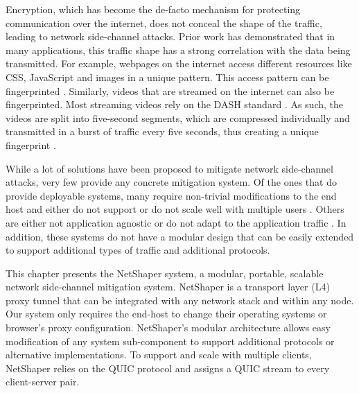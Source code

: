 
Encryption, which has become the de-facto mechanism for protecting communication over the internet, does not conceal the shape of the traffic, leading to network side-channel attacks.
Prior work has demonstrated that in many applications, this traffic shape has a strong correlation with the data being transmitted.
For example, webpages on the internet access different resources like CSS, JavaScript and images in a unique pattern.
This access pattern can be fingerprinted \cite{gong2010fingerprinting, bhat2019varcnn, wang2014supersequence}.
Similarly, videos that are streamed on the internet can also be fingerprinted.
Most streaming videos rely on the DASH standard \cite{dash2013}.
As such, the videos are split into five-second segments, which are compressed individually and transmitted in a burst of traffic every five seconds, thus creating a unique fingerprint \cite{schuster2017beautyburst}.


While a lot of solutions have been proposed to mitigate network side-channel attacks, very few provide any concrete mitigation system.
Of the ones that do provide deployable systems, many require non-trivial modifications to the end host and either do not support or do not scale well with multiple users \cite{cai2014csbuflo, cherubin2017llama, luo2011httpos, smith2022qcsd, wang2017walkie, mehta2022pacer}.
Others are either not application agnostic or do not adapt to the application traffic \cite{barradas2017deltashaper, cherubin2017llama, luo2011httpos}.
In addition, these systems do not have a modular design that can be easily extended to support additional types of traffic and additional protocols.

This chapter presents the NetShaper system, a modular, portable, scalable network side-channel mitigation system.
NetShaper is a transport layer (L4) proxy tunnel that can be integrated with any network stack and within any node.
Our system only requires the end-host to change their operating systems or browser's proxy configuration.
NetShaper's modular architecture allows easy modification of any system sub-component to support additional protocols or alternative implementations.
To support and scale with multiple clients, NetShaper relies on the QUIC protocol and assigns a QUIC stream to every client-server pair.

